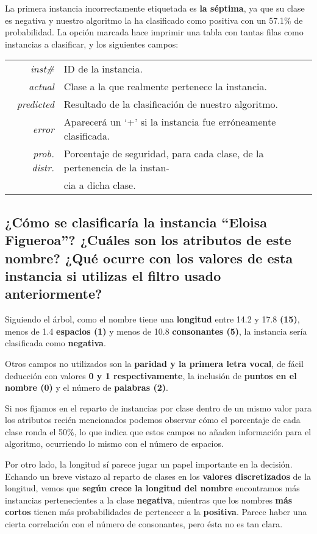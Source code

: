\documentclass[12pt]{article}
\begin{document}
La primera instancia incorrectamente etiquetada es \textbf{la séptima}, ya que su clase es negativa y nuestro algoritmo la ha clasificado como positiva con un 57.1\% de probabilidad. La opción marcada hace imprimir una tabla con tantas filas como instancias a clasificar, y los siguientes campos:

\begin{tabular}{rl}
    \emph{inst\#} & ID de la instancia.\\
    \emph{actual} & Clase a la que realmente pertenece la instancia.\\
    \emph{predicted} & Resultado de la clasificación de nuestro algoritmo.\\
    \emph{error} & Aparecerá un `+' si la instancia fue erróneamente clasificada.\\
    \emph{prob. distr.} & Porcentaje de seguridad, para cada clase, de la pertenencia de la instan- \\ &cia a dicha clase.
\end{tabular}

\subsection*{\small ¿Cómo se clasificaría la instancia ``Eloisa Figueroa''? ¿Cuáles son los atributos de este nombre? ¿Qué ocurre con los valores de esta instancia si utilizas el filtro usado anteriormente?}

Siguiendo el árbol, como el nombre tiene una \textbf{longitud} entre 14.2 y 17.8 \textbf{(15)}, menos de 1.4 \textbf{espacios (1)} y menos de 10.8 \textbf{consonantes (5)}, la instancia sería clasificada como \textbf{negativa}.

Otros campos no utilizados son la \textbf{paridad y la primera letra vocal}, de fácil deducción con valores \textbf{0 y 1 respectivamente}, la inclusión de \textbf{puntos en el nombre (0)} y el número de \textbf{palabras (2)}.

Si nos fijamos en el reparto de instancias por clase dentro de un mismo valor para los atributos recién mencionados podemos observar cómo el porcentaje de cada clase ronda el 50\%, lo que indica que estos campos no añaden información para el algoritmo, ocurriendo lo mismo con el número de espacios.

Por otro lado, la longitud sí parece jugar un papel importante en la decisión. Echando un breve vistazo al reparto de clases en los \textbf{valores discretizados} de la longitud, vemos que \textbf{según crece la longitud del nombre} encontramos más instancias pertenecientes a la clase \textbf{negativa}, mientras que los nombres \textbf{más cortos} tienen más probabilidades de pertenecer a la \textbf{positiva}. Parece haber una cierta correlación con el número de consonantes, pero ésta no es tan clara.
\end{document}
